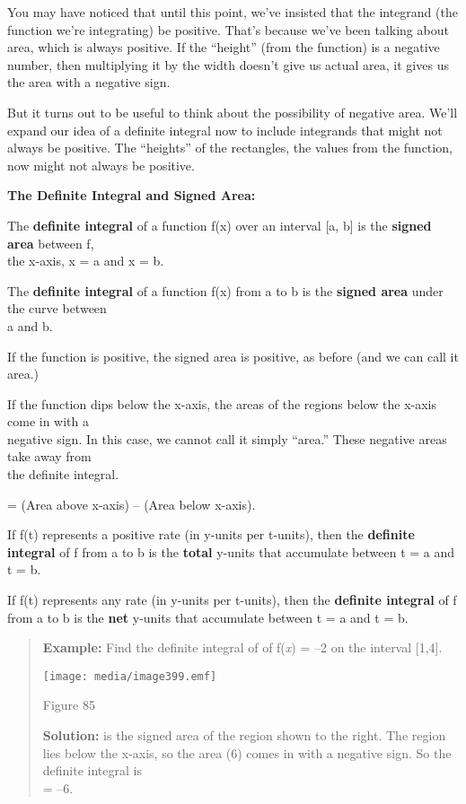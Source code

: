 You may have noticed that until this point, we've insisted that the
integrand (the function we're integrating) be positive. That's because
we've been talking about area, which is always positive. If the
``height'' (from the function) is a negative number, then multiplying it
by the width doesn't give us actual area, it gives us the area with a
negative sign.

But it turns out to be useful to think about the possibility of negative
area. We'll expand our idea of a definite integral now to include
integrands that might not always be positive. The ``heights'' of the
rectangles, the values from the function, now might not always be
positive.

\textbf{The Definite Integral and Signed Area:}

The \textbf{definite integral} of a function f(x) over an interval {[}a,
b{]} is the \textbf{signed area} between f,\\
the x-axis, x = a and x = b.

The \textbf{definite integral} of a function f(x) from a to b is the
\textbf{signed area} under the curve between\\
a and b.

If the function is positive, the signed area is positive, as before (and
we can call it area.)

If the function dips below the x-axis, the areas of the regions below
the x-axis come in with a\\
negative sign. In this case, we cannot call it simply ``area.'' These
negative areas take away from\\
the definite integral.

= (Area above x-axis) -- (Area below x-axis).

If f(t) represents a positive rate (in y-units per t-units), then the
\textbf{definite integral} of f from a to b is the \textbf{total}
y-units that accumulate between t = a and t = b.

If f(t) represents any rate (in y-units per t-units), then the
\textbf{definite integral} of f from a to b is the \textbf{net} y-units
that accumulate between t = a and t = b.

\begin{quote}
\textbf{Example:} Find the definite integral of of f(\emph{x}) = --2 on
the interval {[}1,4{]}.

\texttt{[image: media/image399.emf]}

Figure 85

\textbf{Solution:} is the signed area of the region shown to the right.
The region lies below the x-axis, so the area (6) comes in with a
negative sign. So the definite integral is\\
= --6.
\end{quote}

